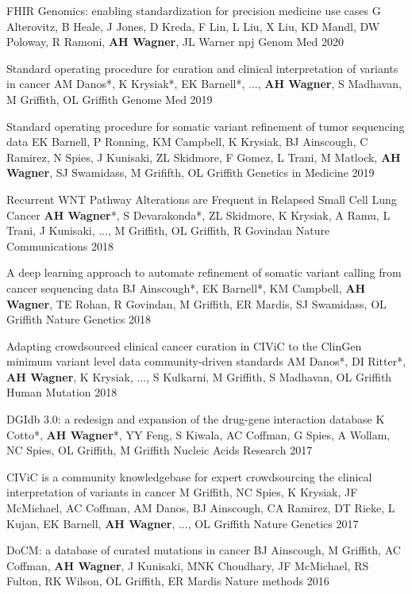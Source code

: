 \pub
{FHIR Genomics: enabling standardization for precision medicine use cases}
{G Alterovitz, B Heale, J Jones, D Kreda, F Lin, L Liu, X Liu, KD Mandl, DW Poloway, R Ramoni, {\bf AH Wagner}, JL Warner}
{npj Genom Med}
{2020}

\pub
{Standard operating procedure for curation and clinical interpretation of variants in cancer}
{AM Danos*, K Krysiak*, EK Barnell*, ..., {\bf AH Wagner}, S Madhavan, M Griffith, OL Griffith}
{Genome Med}
{2019}

\pub
{Standard operating procedure for somatic variant refinement of tumor sequencing data}
{EK Barnell, P Ronning, KM Campbell, K Krysiak, BJ Ainscough, C Ramirez, N Spies, J Kunisaki, ZL Skidmore, F Gomez, L Trani, M Matlock, {\bf AH Wagner}, SJ Swamidass, M Grififth, OL Griffith}
{Genetics in Medicine}
{2019}

\pub
{Recurrent WNT Pathway Alterations are Frequent in Relapsed Small Cell Lung Cancer}
{{\bf AH Wagner}*, S Devarakonda*, ZL Skidmore, K Krysiak, A Ramu, L Trani, J Kunisaki, ..., M Griffith, OL Griffith, R Govindan}
{Nature Communications}
{2018}

\pub
{A deep learning approach to automate refinement of somatic variant calling from cancer sequencing data}
{BJ Ainscough*, EK Barnell*, KM Campbell, {\bf AH Wagner}, TE Rohan, R Govindan, M Griffith, ER Mardis, SJ Swamidass, OL Griffith}
{Nature Genetics}
{2018}

\pub
{Adapting crowdsourced clinical cancer curation in CIViC to the ClinGen minimum variant level data community-driven standards}
{AM Danos*, DI Ritter*, {\bf AH Wagner}, K Krysiak, ..., S Kulkarni, M Griffith, S Madhavan, OL Griffith}
{Human Mutation}
{2018}

\pub
{DGIdb 3.0: a redesign and expansion of the drug-gene interaction database}
{K Cotto*, {\bf AH Wagner}*, YY Feng, S Kiwala, AC Coffman, G Spies, A Wollam, NC Spies, OL Griffith, M Griffith }
{Nucleic Acids Research}
{2017}

\pub
{CIViC is a community knowledgebase for expert crowdsourcing the clinical interpretation of variants in cancer}
{M Griffith, NC Spies, K Krysiak, JF McMichael, AC Coffman, AM Danos, BJ Ainscough, CA Ramirez, DT Rieke, L Kujan, EK Barnell, {\bf AH Wagner}, ..., OL Griffith}
{Nature Genetics}
{2017}

\pub
{DoCM: a database of curated mutations in cancer}
{BJ Ainscough, M Griffith, AC Coffman, {\bf AH Wagner}, J Kunisaki, MNK Choudhary, JF McMichael, RS Fulton, RK Wilson, OL Griffith, ER Mardis}
{Nature methods}
{2016}

